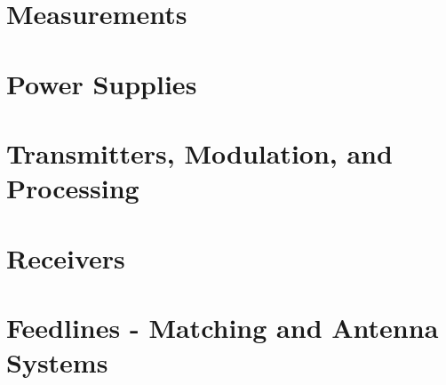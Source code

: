 \documentclass[letterpaper]{article}
\begin{document}
    \section{Measurements}

    \section{Power Supplies}

    \section{Transmitters, Modulation, and Processing}

    \section{Receivers}

    \section{Feedlines - Matching and Antenna Systems}
\end{document}
